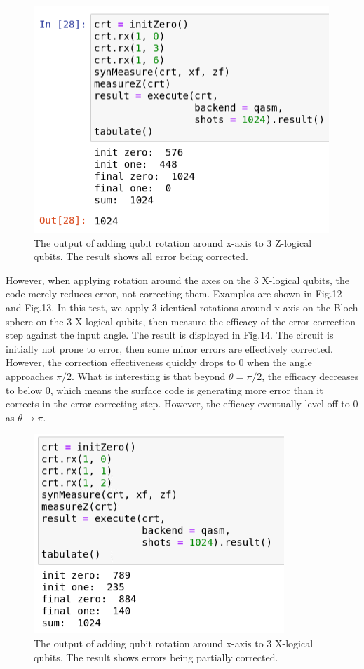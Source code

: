 \documentclass{article}
\begin{document}
\begin{figure}[p]
    \centering
    \includegraphics[width = 0.6\linewidth]{surface/rx-zl.PNG}
    \caption{The output of adding qubit rotation around x-axis to 3 Z-logical qubits. The result shows all error being corrected.}
    \label{fig:my_label}
\end{figure}

However, when applying rotation around the axes on the 3 X-logical qubits, the code merely reduces error, not correcting them. Examples are shown in Fig.12 and Fig.13. In this test, we apply 3 identical rotations around x-axis on the Bloch sphere on the 3 X-logical qubits, then measure the efficacy of the error-correction step against the input angle. The result is displayed in Fig.14. The circuit is initially not prone to error, then some minor errors are effectively corrected. However, the correction effectiveness quickly drops to 0 when the angle approaches $\pi/2$. What is interesting is that beyond $\theta = \pi/2$, the efficacy decreases to below 0, which means the surface code is generating more error than it corrects in the error-correcting step. However, the efficacy eventually level off to 0 as $\theta \xrightarrow{} \pi$.

\begin{figure}[h]
    \centering
    \includegraphics[width = 0.5\linewidth]{surface/rx-xl.PNG}
    \caption{The output of adding qubit rotation around x-axis to 3 X-logical qubits. The result shows errors being partially corrected.}
    \label{fig:my_label}
\end{figure}
\end{document}
